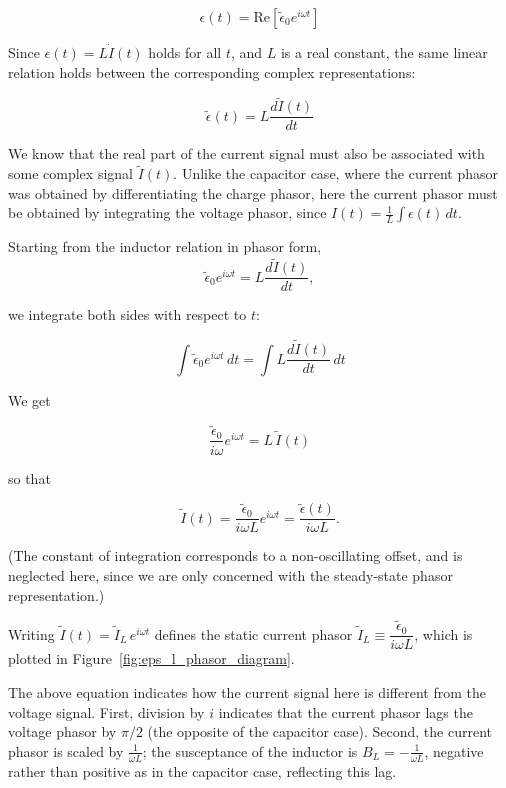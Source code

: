 \documentclass[11pt]{article}
\begin{document}
$$ \epsilon(t) = \text{Re}\left[\tilde{\epsilon}_0 e^{i \omega t}\right] $$

Since $\epsilon(t) = L\dot{I}(t)$ holds for all $t$, and $L$ is a real constant, the same linear relation holds between the corresponding complex representations:

$$ \tilde{\epsilon}(t) = L \frac{d\tilde{I}(t)}{dt} $$

We know that the real part of the current signal must also be associated with some complex signal $\tilde{I}(t)$. Unlike the capacitor case, where the current phasor was obtained by differentiating the charge phasor, here the current phasor must be obtained by integrating the voltage phasor, since $I(t) = \frac{1}{L}\int \epsilon(t) \, dt$.

Starting from the inductor relation in phasor form,
$$ \tilde{\epsilon}_0 e^{i \omega t} = L \frac{d\tilde{I}(t)}{dt}, $$

we integrate both sides with respect to $t$:

$$ \int \tilde{\epsilon}_0 e^{i \omega t} \, dt = \int L \frac{d\tilde{I}(t)}{dt} \, dt $$

We get

$$ \frac{\tilde{\epsilon}_0}{i\omega} e^{i \omega t} = L\, \tilde{I}(t) $$

so that

$$ \tilde{I}(t) = \frac{\tilde{\epsilon}_0}{i \omega L} e^{i \omega t} = \frac{\tilde{\epsilon}(t)}{i \omega L}. $$

(The constant of integration corresponds to a non-oscillating offset, and is neglected here, since we are only concerned with the steady-state phasor representation.)

Writing $\tilde{I}(t) = \tilde{I}_L\, e^{i\omega t}$ defines the static current phasor $\tilde{I}_L \equiv \dfrac{\tilde{\epsilon}_0}{i \omega L}$, which is plotted in Figure~\ref{fig:eps_l_phasor_diagram}.

The above equation indicates how the current signal here is different from the voltage signal. First, division by $i$ indicates that the current phasor lags the voltage phasor by $\pi/2$ (the opposite of the capacitor case). Second, the current phasor is scaled by $\frac{1}{\omega L}$; the susceptance of the inductor is $B_L = -\frac{1}{\omega L}$, negative rather than positive as in the capacitor case, reflecting this lag.
\end{document}
